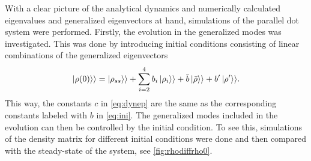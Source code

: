\documentclass[../main.tex]{subfiles}
\begin{document}
With a clear picture of the analytical dynamics and numerically calculated eigenvalues and generalized eigenvectors at hand, simulations of the parallel dot system were performed. Firstly, the evolution in the generalized modes was investigated. This was done by introducing initial conditions consisting of linear combinations of the generalized eigenvectors
\begin{equation}\label{eq:ini}
    \ket{\rho(0)}\rangle = \ket{\rho_{ss}}\rangle + \sum_{i=2}^4 b_i\ket{\rho_i}\rangle + \bar b \ket{\bar\rho}\rangle + b'\ket{\rho'}\rangle.
\end{equation}
This way, the constants $c$ in \cref{eq:dynep} are the same as the corresponding constants labeled with $b$ in \cref{eq:ini}. The generalized modes included in the evolution can then be controlled by the initial condition. To see this, simulations of the density matrix for different initial conditions were done and then compared with the steady-state of the system, see \cref{fig:rhodiffrho0}. 
\end{document}

